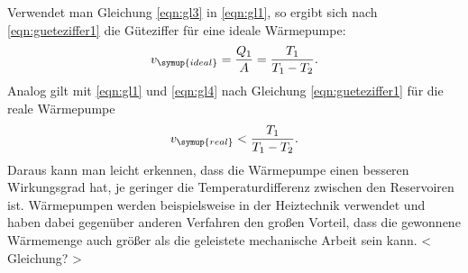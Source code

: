   Verwendet man Gleichung \eqref{eqn:gl3} in \eqref{eqn:gl1}, so ergibt sich nach
  \eqref{eqn:gueteziffer1} die Güteziffer für eine ideale Wärmepumpe:
  \begin{equation}
    v_\symup{ideal} = \frac {Q_1}{A} = \frac{T_1}{T_1 - T_2}.
    \label{eqn:gueteziffer_ideal}
  \end{equation}
  Analog gilt mit \eqref{eqn:gl1} und \eqref{eqn:gl4} nach Gleichung \eqref{eqn:gueteziffer1}
  für die reale Wärmepumpe
  \begin{equation}
    v_\symup{real} < \frac{T_1}{T_1 - T_2}.
    \label{eqn:gueteziffer_real}
  \end{equation}
  Daraus kann man leicht erkennen, dass die Wärmepumpe einen besseren Wirkungsgrad
  hat, je geringer die Temperaturdifferenz zwischen den Reservoiren ist.
  Wärmepumpen werden beispielsweise in der Heiztechnik verwendet und haben dabei
  gegenüber anderen Verfahren den großen Vorteil, dass die gewonnene Wärmemenge
  auch größer als die geleistete mechanische Arbeit sein kann.
  < Gleichung? >
